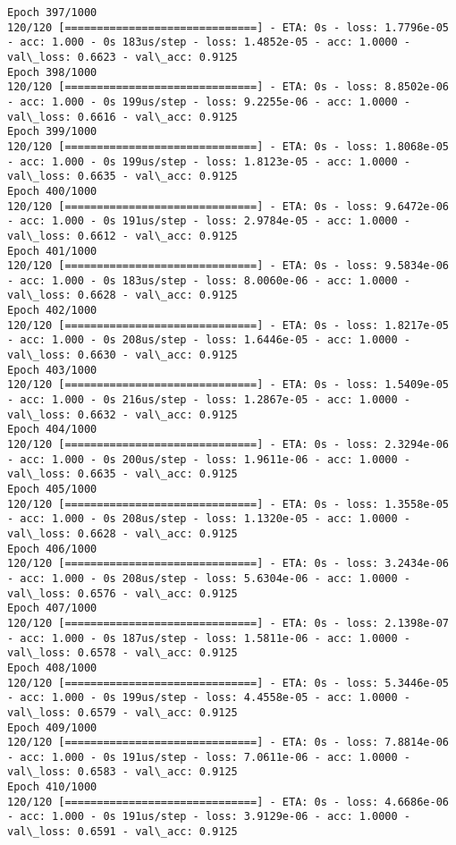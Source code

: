 \documentclass[11pt]{article}
\begin{document}
\begin{Verbatim}[commandchars=\\\{\}]
Epoch 397/1000
120/120 [==============================] - ETA: 0s - loss: 1.7796e-05 - acc: 1.000 - 0s 183us/step - loss: 1.4852e-05 - acc: 1.0000 - val\_loss: 0.6623 - val\_acc: 0.9125
Epoch 398/1000
120/120 [==============================] - ETA: 0s - loss: 8.8502e-06 - acc: 1.000 - 0s 199us/step - loss: 9.2255e-06 - acc: 1.0000 - val\_loss: 0.6616 - val\_acc: 0.9125
Epoch 399/1000
120/120 [==============================] - ETA: 0s - loss: 1.8068e-05 - acc: 1.000 - 0s 199us/step - loss: 1.8123e-05 - acc: 1.0000 - val\_loss: 0.6635 - val\_acc: 0.9125
Epoch 400/1000
120/120 [==============================] - ETA: 0s - loss: 9.6472e-06 - acc: 1.000 - 0s 191us/step - loss: 2.9784e-05 - acc: 1.0000 - val\_loss: 0.6612 - val\_acc: 0.9125
Epoch 401/1000
120/120 [==============================] - ETA: 0s - loss: 9.5834e-06 - acc: 1.000 - 0s 183us/step - loss: 8.0060e-06 - acc: 1.0000 - val\_loss: 0.6628 - val\_acc: 0.9125
Epoch 402/1000
120/120 [==============================] - ETA: 0s - loss: 1.8217e-05 - acc: 1.000 - 0s 208us/step - loss: 1.6446e-05 - acc: 1.0000 - val\_loss: 0.6630 - val\_acc: 0.9125
Epoch 403/1000
120/120 [==============================] - ETA: 0s - loss: 1.5409e-05 - acc: 1.000 - 0s 216us/step - loss: 1.2867e-05 - acc: 1.0000 - val\_loss: 0.6632 - val\_acc: 0.9125
Epoch 404/1000
120/120 [==============================] - ETA: 0s - loss: 2.3294e-06 - acc: 1.000 - 0s 200us/step - loss: 1.9611e-06 - acc: 1.0000 - val\_loss: 0.6635 - val\_acc: 0.9125
Epoch 405/1000
120/120 [==============================] - ETA: 0s - loss: 1.3558e-05 - acc: 1.000 - 0s 208us/step - loss: 1.1320e-05 - acc: 1.0000 - val\_loss: 0.6628 - val\_acc: 0.9125
Epoch 406/1000
120/120 [==============================] - ETA: 0s - loss: 3.2434e-06 - acc: 1.000 - 0s 208us/step - loss: 5.6304e-06 - acc: 1.0000 - val\_loss: 0.6576 - val\_acc: 0.9125
Epoch 407/1000
120/120 [==============================] - ETA: 0s - loss: 2.1398e-07 - acc: 1.000 - 0s 187us/step - loss: 1.5811e-06 - acc: 1.0000 - val\_loss: 0.6578 - val\_acc: 0.9125
Epoch 408/1000
120/120 [==============================] - ETA: 0s - loss: 5.3446e-05 - acc: 1.000 - 0s 199us/step - loss: 4.4558e-05 - acc: 1.0000 - val\_loss: 0.6579 - val\_acc: 0.9125
Epoch 409/1000
120/120 [==============================] - ETA: 0s - loss: 7.8814e-06 - acc: 1.000 - 0s 191us/step - loss: 7.0611e-06 - acc: 1.0000 - val\_loss: 0.6583 - val\_acc: 0.9125
Epoch 410/1000
120/120 [==============================] - ETA: 0s - loss: 4.6686e-06 - acc: 1.000 - 0s 191us/step - loss: 3.9129e-06 - acc: 1.0000 - val\_loss: 0.6591 - val\_acc: 0.9125

\end{Verbatim}
\end{document}
